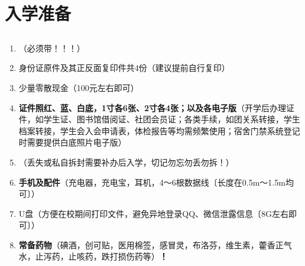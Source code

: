\section[入学准备]{入学准备}

\subsection[必要证件及物品]{}
\begin{enumerate}
    \item \textbf{}（必须带！！！）
    \item 身份证原件及其正反面复印件共4份（建议提前自行复印）
    \item 少量零散现金（100元左右即可）\footnotemark
    \item \textbf{证件照红、蓝、白底，1寸各6张、2寸各4张；以及各电子版}（开学后办理证件，如学生证、图书馆借阅证、社团会员证；各类手续，如团关系转接，学生档案转接，学生会入会申请表，体检报告等均需频繁使用；宿舍门禁系统登记时需要提供白底照片电子版）
    \item \textbf{}（丢失或私自拆封需要补办后入学，切记勿忘勿丢勿拆！）
    \item \textbf{手机及配件}（充电器，充电宝，耳机，4～6根数据线〔长度在0.5m～1.5m均可〕）
    \item U盘（方便在校期间打印文件，避免异地登录QQ、微信泄露信息〔8G左右即可〕）
    \item \textbf{常备药物}（碘酒，创可贴，医用棉签，感冒灵，布洛芬，维生素，藿香正气水，止泻药，止咳药，跌打损伤药等）\textbf{！}
\end{enumerate}

